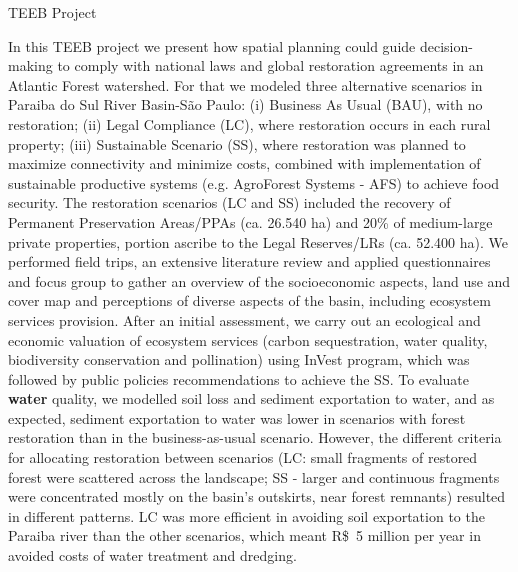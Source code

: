 \begin{mybox}{TEEB Project}\label{Box3}

 In this TEEB project we present how spatial planning could guide decision-making to comply with national laws and global restoration agreements in an Atlantic Forest watershed. For that we modeled three alternative scenarios in Paraiba do Sul River Basin-São Paulo: (i) Business As Usual (BAU), with no restoration; (ii) Legal Compliance (LC), where restoration occurs in each rural property; (iii) Sustainable Scenario (SS), where restoration was planned to maximize connectivity and minimize costs, combined with implementation of sustainable productive systems (e.g. AgroForest Systems - AFS) to achieve food security. The restoration scenarios (LC and SS) included the recovery of Permanent Preservation Areas/PPAs (ca. 26.540 ha) and 20\% of medium-large private properties, portion ascribe to the Legal Reserves/LRs (ca. 52.400 ha). We performed field trips, an extensive literature review and applied questionnaires and focus group to gather an overview of the socioeconomic aspects, land use and cover map and perceptions of diverse aspects of the basin, including ecosystem services provision. After an initial assessment, we carry out an ecological and economic valuation of ecosystem services (carbon sequestration, water quality, biodiversity conservation and pollination) using InVest program, which was followed by public policies recommendations to achieve the SS. To evaluate \textbf{water} quality, we modelled soil loss and sediment exportation to water, and as expected, sediment exportation to water was lower in scenarios with forest restoration than in the business-as-usual scenario. However, the different criteria for allocating restoration between scenarios (LC: small fragments of restored forest were scattered across the landscape; SS - larger and continuous fragments were concentrated mostly on the basin’s outskirts, near forest remnants) resulted in different patterns. LC was more efficient in avoiding soil exportation to the Paraiba river than the other scenarios, which meant R\$\ 5 million per year in avoided costs of water treatment and dredging. %
\end{mybox}




